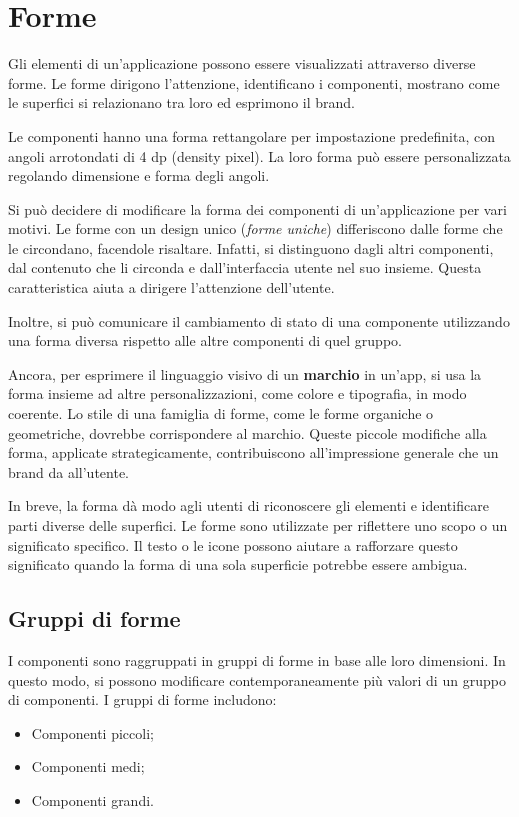 \documentclass[12pt, a4paper]{report}
\begin{document}
	\section{Forme}
	Gli elementi di un’applicazione possono essere visualizzati attraverso diverse forme. Le forme dirigono l'attenzione, identificano i componenti, mostrano come le superfici si relazionano tra loro ed esprimono il brand.


	Le componenti hanno una forma rettangolare per impostazione predefinita, con angoli arrotondati di 4 dp (density pixel). La loro forma può essere personalizzata regolando dimensione e forma degli angoli.

	Si può decidere di modificare la forma dei componenti di un’applicazione per vari motivi. Le forme con un design unico (\textit{forme uniche}) differiscono dalle forme che le circondano, facendole risaltare. Infatti, si
	distinguono dagli altri componenti, dal contenuto che li circonda e dall'interfaccia utente nel suo insieme. Questa caratteristica aiuta a dirigere l'attenzione dell'utente.

	Inoltre, si può comunicare il cambiamento di stato di una componente utilizzando una forma diversa rispetto alle altre componenti di quel gruppo.

	Ancora, per esprimere il linguaggio visivo di un \textbf{marchio} in un'app, si usa la forma insieme ad altre personalizzazioni, come colore e tipografia, in modo coerente. Lo stile di una famiglia di forme, come le forme organiche o geometriche, dovrebbe corrispondere
	al marchio. Queste piccole modifiche alla forma, applicate strategicamente, contribuiscono all'impressione generale che un brand da all’utente.

	In breve, la forma dà modo agli utenti di riconoscere gli elementi e identificare parti diverse delle superfici. Le forme sono utilizzate per riflettere uno scopo o un significato specifico. Il testo o le icone possono aiutare a rafforzare questo significato quando la forma di una sola superficie potrebbe essere ambigua.

	\subsection{Gruppi di forme}
	I componenti sono raggruppati in gruppi di forme in base alle loro dimensioni. In questo modo, si possono modificare contemporaneamente più valori di un gruppo di componenti. I gruppi di forme includono:
	\begin{itemize}
		\item Componenti piccoli;
		\item Componenti medi;
		\item Componenti grandi.
	\end{itemize}
\end{document}
